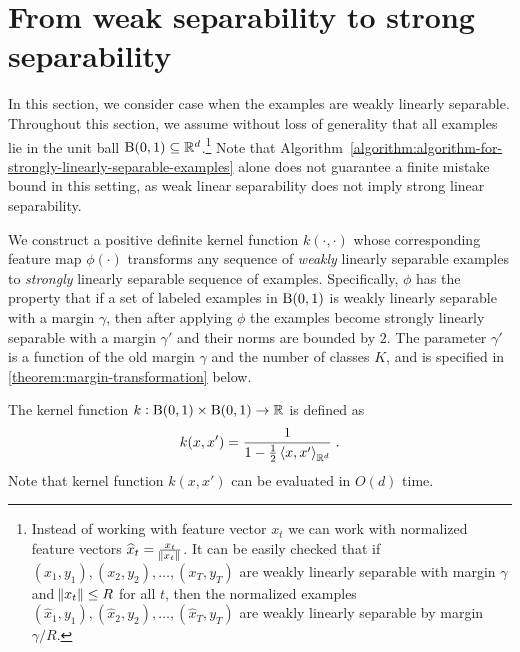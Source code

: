 \section{From weak separability to strong separability}
\label{section:from-weak-separability-to-strong-separability}

In this section, we consider case when the examples are weakly linearly
separable. Throughout this section, we assume without loss of generality that
all examples lie in the unit ball $\operatorname{B}(0,1) \subseteq \mathbb{R}^d$.\footnote{Instead of
working with feature vector $x_t$ we can work with normalized feature vectors
$\widehat{x}_t = \frac{x_t}{\norm{x_t}}$. It can be easily checked that if
$(x_1,y_1), (x_2,y_2), \dots, (x_T,y_T)$ are weakly linearly separable with
margin $\gamma$ and $\norm{x_t} \le R$ for all $t$, then the normalized examples
$(\widehat{x}_1,y_1), (\widehat{x}_2,y_2), \dots, (\widehat{x}_T,y_T)$ are weakly
linearly separable by margin $\gamma/R$.} Note that
Algorithm~\ref{algorithm:algorithm-for-strongly-linearly-separable-examples}
alone does not guarantee a finite mistake bound in this setting, as weak linear
separability does not imply strong linear separability.

We construct a positive definite kernel function $k(\cdot, \cdot)$ whose
corresponding feature map $\phi(\cdot)$ transforms any sequence of \emph{weakly}
linearly separable examples to \emph{strongly} linearly separable sequence of
examples. Specifically, $\phi$ has the property that if a set of labeled
examples in $\operatorname{B}(0,1)$ is weakly linearly separable with a margin $\gamma$, then
after applying $\phi$ the examples become strongly linearly separable with a
margin $\gamma'$ and their norms are bounded by $2$. The parameter $\gamma'$ is
a function of the old margin $\gamma$ and the number of classes $K$, and is
specified in \autoref{theorem:margin-transformation} below.

The kernel function $k:\operatorname{B}(0,1) \times \operatorname{B}(0,1) \to \mathbb{R}$ is defined as
$$
k(x,x') = \frac{1}{1 - \frac{1}{2}\left\langle x, x' \right\rangle_{\mathbb{R}^d}} \; .
$$
Note that kernel function $k(x,x')$ can be evaluated in $O(d)$ time.

